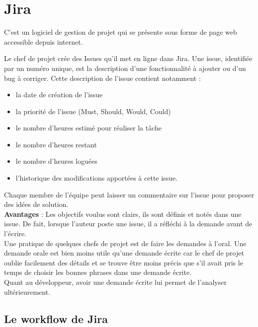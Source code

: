 \section{Jira}


C'est un logiciel de gestion de projet qui se présente sous forme de page web
accessible depuis internet.

Le chef de projet crée des Issues qu'il met en ligne dans Jira.
Une issue, identifiée par un numéro unique, est la description d'une
fonctionnalité à ajouter ou d'un bug à corriger. 
Cette description de l'issue contient notamment :
\begin{itemize}
\item la date de création de l'issue
\item la priorité de l'issue (Must, Should, Would, Could)
\item le nombre d'heures estimé pour réaliser la tâche
\item le nombre d'heures restant
\item le nombre d'heures loguées
\item l'historique des modifications apportées à cette issue.\\

\end{itemize}

Chaque membre de l'équipe peut laisser un commentaire sur l'issue pour
proposer des idées de solution.\\

\textbf{Avantages} :
Les objectifs voulus sont clairs, ils sont définis et notés dans une issue.
De fait, lorsque l'auteur poste une issue, il a réfléchi à la demande avant de
l'écrire. \\
Une pratique de quelques chefs de projet est de faire les demandes à l'oral.
Une demande orale est bien moins utile qu'une demande écrite car le chef de
projet oublie facilement des détails et se trouve être moins précis que s'il
avait pris le temps de choisir les bonnes phrases dans une demande écrite.\\
Quant au développeur, avoir une demande écrite lui permet de l'analyser
ultérieurement.


\subsection{Le workflow de Jira}

